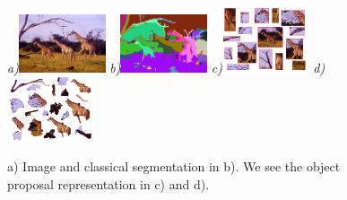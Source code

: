 \begin{figure}[ht]
\centering
{\footnotesize\textit{a)}}\includegraphics[width=0.228\textwidth]{figs/three.jpg}
{\footnotesize\textit{b)}}\includegraphics[width=0.228\textwidth]{figs/out.png}
{\footnotesize\textit{c)}}\includegraphics[width=0.228\textwidth]{figs/giraffe_bbox.png}
{\footnotesize\textit{d)}}\includegraphics[width=0.228\textwidth]{figs/giraffe_ops.png}
\caption{a) Image and classical segmentation in b). We see the object proposal representation in c) and d).}
\label{fig:diffs}
\end{figure}

